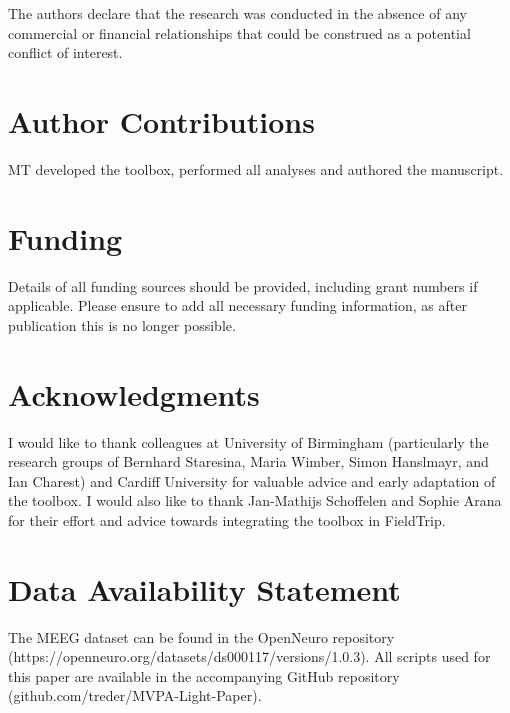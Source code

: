 \documentclass[utf8]{frontiersSCNS} %
\begin{document}
The authors declare that the research was conducted in the absence of any commercial or financial relationships that could be construed as a potential conflict of interest.

\section*{Author Contributions}

MT developed the toolbox, performed all analyses and authored the manuscript.

\section*{Funding}
Details of all funding sources should be provided, including grant numbers if applicable. Please ensure to add all necessary funding information, as after publication this is no longer possible.

\section*{Acknowledgments}
I would like to thank colleagues at University of Birmingham (particularly the research groups of Bernhard Staresina, Maria Wimber, Simon Hanslmayr, and Ian Charest) and Cardiff University for valuable advice and early adaptation of the toolbox. I would also like to thank Jan-Mathijs Schoffelen and Sophie Arana for their effort and advice towards integrating the toolbox in FieldTrip.

\section*{Data Availability Statement}
The MEEG dataset can be found in the OpenNeuro repository (https://openneuro.org/datasets/ds000117/versions/1.0.3). All scripts used for this paper are available in the accompanying GitHub repository (github.com/treder/MVPA-Light-Paper).



\end{document}
